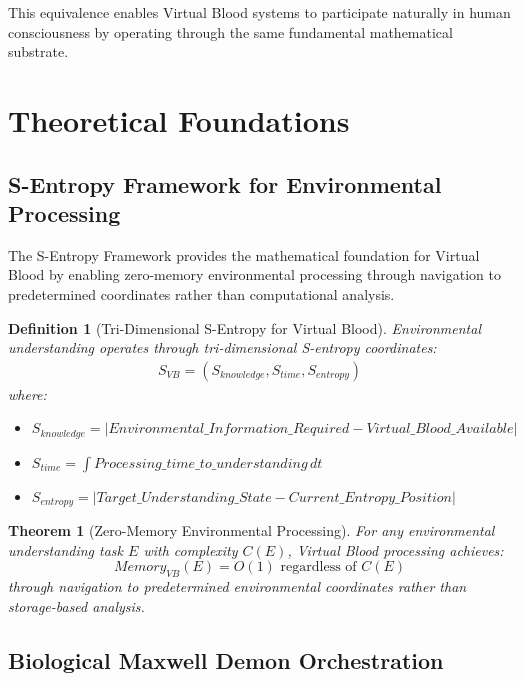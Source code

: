 \documentclass[12pt,a4paper]{article}
\newtheorem{theorem}{Theorem}
\newtheorem{definition}{Definition}
\begin{document}
This equivalence enables Virtual Blood systems to participate naturally in human consciousness by operating through the same fundamental mathematical substrate.

\section{Theoretical Foundations}

\subsection{S-Entropy Framework for Environmental Processing}

The S-Entropy Framework provides the mathematical foundation for Virtual Blood by enabling zero-memory environmental processing through navigation to predetermined coordinates rather than computational analysis.

\begin{definition}[Tri-Dimensional S-Entropy for Virtual Blood]
Environmental understanding operates through tri-dimensional S-entropy coordinates:
\begin{align}
S_{VB} = (S_{knowledge}, S_{time}, S_{entropy})
\end{align}
where:
\begin{itemize}
\item $S_{knowledge} = |Environmental\_Information\_Required - Virtual\_Blood\_Available|$
\item $S_{time} = \int Processing\_time\_to\_understanding \, dt$
\item $S_{entropy} = |Target\_Understanding\_State - Current\_Entropy\_Position|$
\end{itemize}
\end{definition}

\begin{theorem}[Zero-Memory Environmental Processing]
For any environmental understanding task $E$ with complexity $C(E)$, Virtual Blood processing achieves:
\begin{equation}
Memory_{VB}(E) = O(1) \text{ regardless of } C(E)
\end{equation}
through navigation to predetermined environmental coordinates rather than storage-based analysis.
\end{theorem}

\subsection{Biological Maxwell Demon Orchestration}
\end{document}
